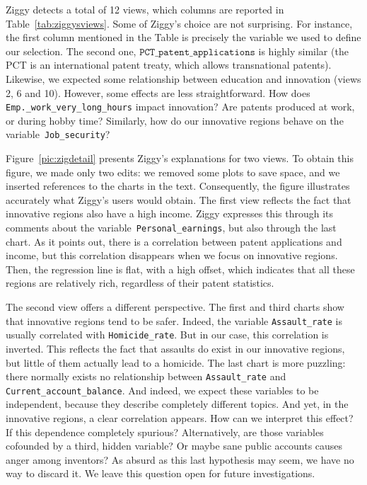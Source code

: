 Ziggy detects a total of 12 views, which columns are reported in
Table~\ref{tab:ziggysviews}. Some of Ziggy's choice are not surprising. For
instance, the first column mentioned in the Table is precisely the variable we
used to define our selection. The second one,
$\texttt{PCT\_patent\_applications}$ is highly similar (the PCT is an
international patent treaty, which allows transnational patents). Likewise, we
expected some relationship between education and innovation (views 2, 6 and
10). However, some effects are less straightforward. How does
\texttt{Emp.\_work\_very\_long\_hours} impact innovation? Are patents produced
at work, or during hobby time? Similarly, how do our innovative regions behave
on the variable~\texttt{Job\_security}?

Figure~\ref{pic:zigdetail} presents Ziggy's explanations for two views. To
obtain this figure, we made only two edits: we removed some plots to save
space, and we inserted references to the charts in the text. Consequently, the
figure illustrates accurately what Ziggy's users would obtain. The first view
reflects the fact that innovative regions also have a high income. Ziggy
expresses this through its comments about the
variable~\texttt{Personal\_earnings}, but also through the last chart. As it
points out, there is a correlation between patent applications and income, but
this correlation disappears when we focus on innovative regions. Then, the
regression line is flat, with a high offset, which indicates that all these
regions are relatively rich, regardless of their patent statistics.

The second view offers a different perspective. The first and third charts show
that innovative regions tend to be safer. Indeed, the variable
\texttt{Assault\_rate} is usually correlated with \texttt{Homicide\_rate}. But
in our case, this correlation is inverted. This reflects the fact that assaults
do exist in our innovative regions, but little of them actually lead to a
homicide. The last chart is more puzzling: there normally exists no
relationship between \texttt{Assault\_rate} and
\texttt{Current\_account\_balance}. And indeed, we expect these variables to be
independent, because they describe completely different topics. And yet, in the
innovative regions, a clear correlation appears. How can we interpret this
effect? If this dependence completely spurious? Alternatively, are those
variables cofounded by a third, hidden variable? Or maybe sane public accounts
causes anger among inventors? As absurd as this last hypothesis may seem, we
have no way to discard it. We leave this question open for future investigations.

